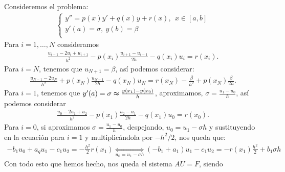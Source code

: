 Consideremos el problema:
\begin{align*}
    \left\{ \begin{array}{lcc}
                y'' = p(x)y' + q(x)y + r(x), \ \ x \in [a,b] \\
                y'(a) = \sigma, \ y(b) = \beta               \\
            \end{array}
    \right.
\end{align*}
Para $i = 1,\ldots,N$ consideramos
\begin{align*}
    \frac{u_{i-1} - 2u_i + u_{i+1}}{h^2} -p(x_i)\frac{u_{i+1} - u_{i-1}}{2h} - q(x_i)u_i = r(x_i).
\end{align*}
Para $i = N$, tenemos que $u_{N+1} = \beta$, así podemos considerar:
\begin{align*}
    \frac{u_{N-1} - 2u_N}{h^2} + p(x_N)\frac{u_{N-1}}{2h} -q(x_N)u_N = r(x_N) - \frac{\beta}{h^2} + p(x_N)\frac{\beta}{2h}.
\end{align*}
Para $i = 1$, tenemos que $y'(a) = \sigma \thickapprox \frac{y(x_1)-y(x_0)}{h}$, aproximamos, $\sigma = \frac{u_1 - u_0}{h}$, así podemos considerar
\begin{align*}
    \frac{u_0 - 2u_1 + u_2}{h^2} - p(x_1)\frac{u_2-u_1}{2h} - q(x_1)u_0 = r(x_0).
\end{align*}
Para $i = 0$, si aproximamos $\sigma = \frac{u_1 - u_0}{h}$, despejando, $u_0 = u_1 - \sigma h$ y sustituyendo en la ecuación para $i = 1$ y multiplicándola por $-h^2/2$, nos queda que:
\begin{align*}
    -b_1u_0 +a_qu_1 - c_1u_2 = -\frac{h^2}{2}r(x_1) \underset{u_0 = u_1 - \sigma h}{\Longleftrightarrow} (-b_1 +a_1)u_1 - c_1u_2 = -r(x_1)\frac{h^2}{2} + b_1\sigma h
\end{align*}
Con todo esto que hemos hecho, nos queda el sistema $AU = F$, siendo

